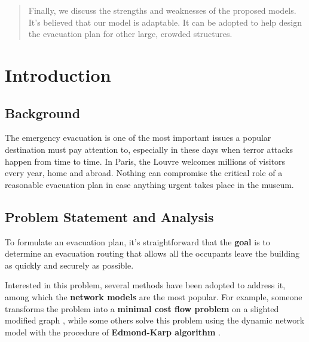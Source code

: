 \documentclass[a4paper,12pt]{article}
\begin{document}
\begin{abstract}
Finally, we discuss the strengths and weaknesses of the proposed models. It's believed that our model is adaptable. It can be adopted to help design the evacuation plan for other large, crowded structures.





\end{abstract}

\maketitle
\thispagestyle{empty}

\newpage
\setcounter{tocdepth}{3}
\tableofcontents
\thispagestyle{empty}
\newpage

\setlength\parskip{0.8\baselineskip}
\setcounter{page}{1}
\pagestyle{fancy}

\section{Introduction}
\subsection{Background}

The emergency evacuation is one of the most important issues a popular destination must pay attention to, especially in these days when terror attacks happen from time to time. In Paris, the Louvre welcomes millions of visitors every year, home and abroad. Nothing can compromise the critical role of a reasonable evacuation plan in case anything urgent takes place in the museum. 


\subsection{Problem Statement and Analysis}

To formulate an evacuation plan, it's straightforward that the \textbf{goal} is to determine an evacuation routing that allows all the occupants leave the building as quickly and securely as possible. 

Interested in this problem, several methods have been adopted to address it, among which the \textbf{network models} are the most popular. For example, someone transforms the problem into a \textbf{minimal cost flow problem} on a slighted modified graph \citep{TAKEOYAMADA1996A}, while some others solve this problem using the dynamic network model with the procedure of \textbf{Edmond-Karp algorithm} \citep{edmonds1972theoretical}.
\end{document}
